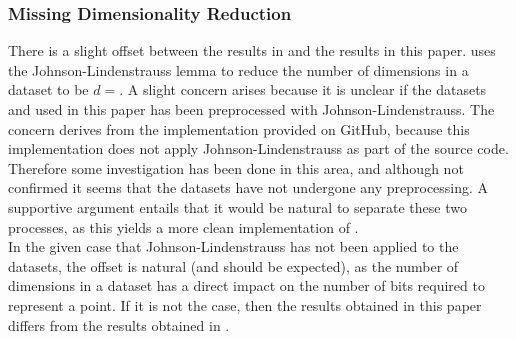 \subsubsection{Missing Dimensionality Reduction}
There is a slight offset between the results in \cite{wagner17} and the results in this paper. \cite{wagner17} uses the Johnson-Lindenstrauss lemma to reduce the number of dimensions in a dataset to be $d=$. A slight concern arises because it is unclear if the datasets \mnist{} and \sift{} used in this paper has been preprocessed with Johnson-Lindenstrauss. The concern derives from the \qs{} implementation provided on GitHub, because this implementation does not apply Johnson-Lindenstrauss as part of the source code. Therefore some investigation has been done in this area, and although not confirmed it seems that the datasets have not undergone any preprocessing. A supportive argument entails that it would be natural to separate these two processes, as this yields a more clean implementation of \qs{}. 
\\
In the given case that Johnson-Lindenstrauss has not been applied to the datasets, the offset is natural (and should be expected), as the number of dimensions in a dataset has a direct impact on the number of bits required to represent a point. If it is not the case, then the results obtained in this paper differs from the results obtained in \cite{wagner17}.